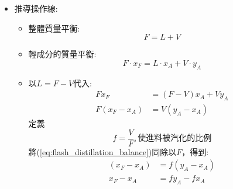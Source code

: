 \documentclass[../main.tex]{subfiles}
\begin{document}
\begin{itemize}
\begin{itemize}
    假設要分離的輕物質是$A$，則可以預期:
    \begin{equation}
      y_A > x_F > x_A
    \end{equation}
    通常題目會是已知$F,x_F$，求出$x_A,y_A$\\
    因為閃蒸槽內部已達Steady State，故
    \begin{enumerate}
      \item $x_A,y_A$，達到平衡，會落在平衡線上(\ref{eq:relative_volatility_xy})式
      \begin{equation}
        y_A = \frac{\alpha_{AB}x_A}{1+\left(\alpha_{AB}-1\right)x_A}
      \end{equation}
      \item 因為$x_A,y_A$為本操作單元的出料，故會落在操作線上
      \begin{equation}
        \boxed{y_A = \frac{f-1}{f}x_A + \frac{x_F}{f}, \quad f=\frac{F}{V}}
      \end{equation}
      P.S. 可見後續推導，但背起來也可以
      \item 所以如果就是求操作線和平衡線的交點\\
        沒圖，就是解聯立方程式
    \end{enumerate}
  \item 推導操作線:
    \begin{itemize}
      \item 整體質量平衡:
      \begin{equation}
        F = L+V
      \end{equation}
      \item 輕成分的質量平衡:
      \begin{equation}
        F\cdot x_F = L\cdot x_A +V\cdot y_A
      \end{equation}
      \item 以$L=F-V$代入:
      \begin{align}
        Fx_F &= (F-V)x_A + V y_A \nonumber\\
        F(x_F - x_A) &= V(y_A - x_A)  \label{eq:flash_distillation_balance}
      \end{align}
      定義
      \begin{equation}
        f = \frac{V}{F}, \text{使進料被汽化的比例}
      \end{equation}
      將(\ref{eq:flash_distillation_balance})同除以$F$，得到:
      \begin{align}
        (x_F - x_A) &= f(y_A - x_A) \nonumber\\
        x_F - x_A &= fy_A - f x_A \nonumber\\

\end{align}
\end{itemize}
\end{itemize}
\end{itemize}
\end{document}
